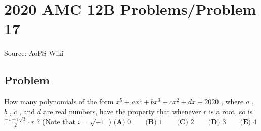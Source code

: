 \documentclass[12pt]{article}
\begin{document}
\section*{{2020 AMC 12B Problems/Problem 17}}
Source: AoPS Wiki

\subsection*{Problem}
How many polynomials of the form $x^5 + ax^4 + bx^3 + cx^2 + dx + 2020$ , where $a$ , $b$ , $c$ , and $d$ are real numbers, have the property that whenever $r$ is a root, so is $\frac{-1+i\sqrt{3}}{2} \cdot r$ ? (Note that $i=\sqrt{-1}$ ) $\textbf{(A) } 0 \qquad \textbf{(B) }1 \qquad \textbf{(C) } 2 \qquad \textbf{(D) } 3 \qquad \textbf{(E) } 4$
\end{document}
